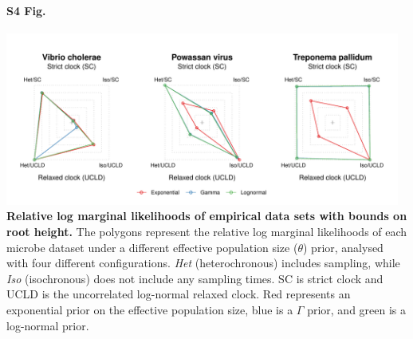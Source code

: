 \documentclass[10pt,letterpaper]{article}
\begin{document}
 \paragraph*{S4 Fig.}
\label{S4_Fig}
	\begin{center}
		\includegraphics[width=13cm]{sandbox_figures/polygon_plot_bound.pdf}\newline
		\textbf{Relative log marginal likelihoods of empirical data sets with bounds on root height.} The polygons represent the relative log marginal likelihoods of each microbe dataset under a different effective population size ($\theta$) prior, analysed with four different configurations. \textit{Het} (heterochronous) includes sampling, while \textit{Iso} (isochronous) does not include any sampling times. SC is strict clock and UCLD is the uncorrelated log-normal relaxed clock. Red represents an exponential prior on the effective population size, blue is a $\Gamma$ prior, and green is a log-normal prior.
	\end{center}
\end{document}
